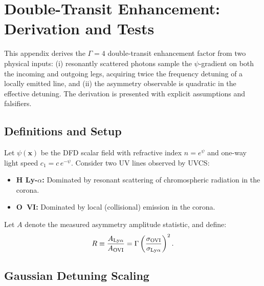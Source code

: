 
\section{Double-Transit Enhancement: Derivation and Tests}\label{app:double-transit}

This appendix derives the $\Gamma = 4$ double-transit enhancement factor from two physical inputs: (i) resonantly scattered photons sample the $\psi$-gradient on both the incoming and outgoing legs, acquiring twice the frequency detuning of a locally emitted line, and (ii) the asymmetry observable is quadratic in the effective detuning.  The derivation is presented with explicit assumptions and falsifiers.

\subsection{Definitions and Setup}

Let $\psi(\mathbf{x})$ be the DFD scalar field with refractive index $n = e^{\psi}$ 
and one-way light speed $c_1 = c\,e^{-\psi}$. Consider two UV lines observed by UVCS:
\begin{itemize}[nosep]
\item \textbf{H Ly-$\alpha$:} Dominated by resonant scattering of chromospheric 
radiation in the corona.
\item \textbf{O~VI:} Dominated by local (collisional) emission in the corona.
\end{itemize}

Let $A$ denote the measured asymmetry amplitude statistic, and define:
\begin{equation}
R \equiv \frac{A_{\rm Ly\alpha}}{A_{\rm OVI}} = \Gamma \left(\frac{\sigma_{\rm OVI}}{\sigma_{\rm Ly\alpha}}\right)^2.
\end{equation}

\subsection{Gaussian Detuning Scaling}

